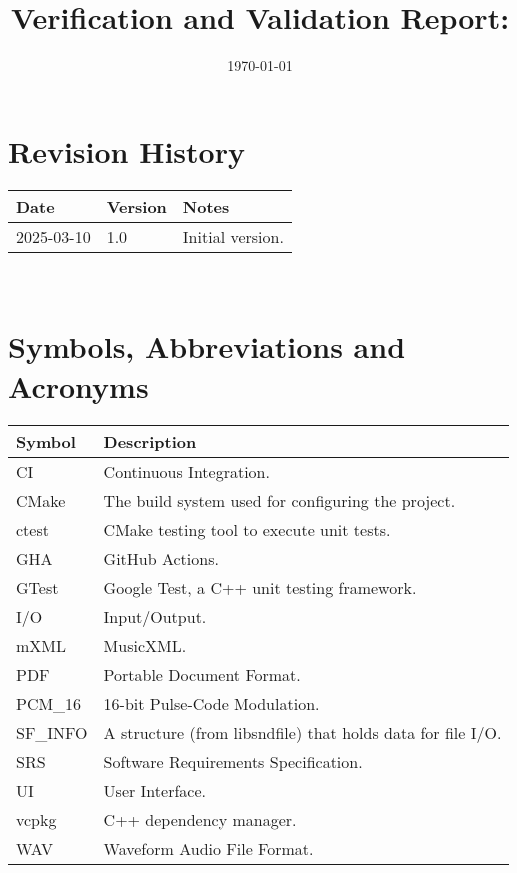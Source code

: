 \documentclass[12pt, titlepage]{article}
\begin{document}
\title{Verification and Validation Report: \progname} 
\author{\authname}
\date{\today}
	
\maketitle


\section{Revision History}

\begin{tabularx}{\textwidth}{p{3cm}p{2cm}X}
\toprule {\bf Date} & {\bf Version} & {\bf Notes}\\
\midrule
2025-03-10 & 1.0 & Initial version.\\
\bottomrule
\end{tabularx}

~\newpage

\section{Symbols, Abbreviations and Acronyms}

\renewcommand{\arraystretch}{1.2}
\begin{table}[h!]
  \vspace{5pt}
  \begin{tabular}{l l} 
    \toprule		
    \textbf{Symbol} & \textbf{Description} \\
    \midrule 
    CI & Continuous Integration. \\
    CMake & The build system used for configuring the project. \\
    ctest& CMake testing tool to execute unit tests. \\
    GHA & GitHub Actions. \\
    GTest & Google Test, a C++ unit testing framework. \\
    I/O & Input/Output. \\
    mXML & MusicXML. \\
    PDF & Portable Document Format. \\
    PCM\_16 & 16-bit Pulse-Code Modulation. \\
    SF\_INFO & A structure (from libsndfile) that holds data for file I/O. \\
    SRS & Software Requirements Specification. \\
    UI & User Interface. \\
    vcpkg & C++ dependency manager. \\
    WAV & Waveform Audio File Format. \\
    \bottomrule
  \end{tabular}\\
\end{table}
\newpage
\end{document}
